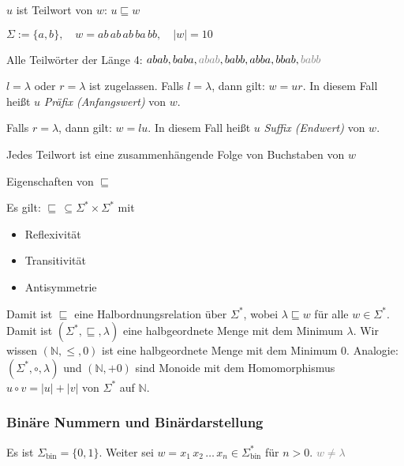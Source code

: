 \documentclass[runningheads,deutsch]{llncs}
\begin{document}
\begin{note}
    $u$ ist Teilwort von $w$: $u \sqsubseteq w$
\end{note}

\begin{example}
    $\Sigma := \{a, b\}, \quad w = ab\, ab\, ab\, ba\, bb, \quad |w| = 10$

    Alle Teilwörter der Länge 4: $abab, baba, \textcolor{gray}{abab}, babb, abba, bbab, \textcolor{gray}{babb}$
\end{example}

\begin{remark}
    $l = \lambda$ oder $r = \lambda$ ist zugelassen. Falls $l = \lambda$, dann gilt: $w = ur$. In diesem Fall heißt $u$ \textit{Präfix (Anfangswert)} von $w$.

    Falls $r = \lambda$, dann gilt: $w = lu$. In diesem Fall heißt $u$ \textit{Suffix (Endwert)} von $w$.
\end{remark}

\begin{remark}
    Jedes Teilwort ist eine zusammenhängende Folge von Buchstaben von $w$
\end{remark}

\begin{property}
    Eigenschaften von $\sqsubseteq$

    Es gilt: $\sqsubseteq\, \subseteq \Sigma^* \times \Sigma^*$ mit
    \begin{itemize}
        \item Reflexivität
        \item Transitivität
        \item Antisymmetrie
    \end{itemize}
    Damit ist $\sqsubseteq$ eine Halbordnungsrelation über $\Sigma^*$, wobei $\lambda \sqsubseteq w$ für alle $w \in \Sigma^*$.
    Damit ist $(\Sigma^*, \sqsubseteq, \lambda)$ eine halbgeordnete Menge mit dem Minimum $\lambda$.
    \color{gray} Wir wissen $(\mathbb{N}, \leq, 0)$ ist eine halbgeordnete Menge mit dem Minimum 0.
    Analogie: $(\Sigma^*, \circ, \lambda)$ und $(\mathbb{N}, + 0)$ sind Monoide mit dem Homomorphismus $u \circ v = |u| + |v|$ von $\Sigma^*$ auf $\mathbb{N}$.
    \color{black}
\end{property}

\subsubsection{Binäre Nummern und Binärdarstellung}
Es ist $\Sigma_{\text{bin}} = \{0, 1\}$. Weiter sei $w = x_1\, x_2\, \dots\, x_n \in \Sigma^*_{\text{bin}}$ für $n > 0$. \textcolor{gray}{$w \neq \lambda$}
\end{document}
